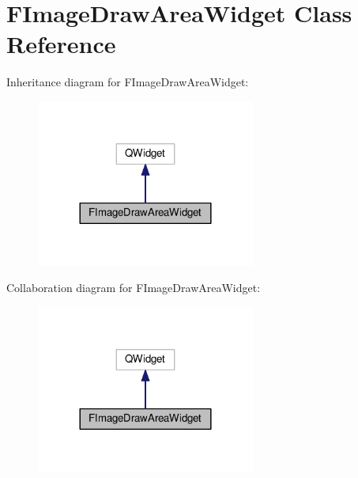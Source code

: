 \hypertarget{classFImageDrawAreaWidget}{}\section{F\+Image\+Draw\+Area\+Widget Class Reference}
\label{classFImageDrawAreaWidget}


Inheritance diagram for F\+Image\+Draw\+Area\+Widget\+:
\nopagebreak
\begin{figure}[H]
\begin{center}
\leavevmode
\includegraphics[width=204pt]{classFImageDrawAreaWidget__inherit__graph}
\end{center}
\end{figure}


Collaboration diagram for F\+Image\+Draw\+Area\+Widget\+:
\nopagebreak
\begin{figure}[H]
\begin{center}
\leavevmode
\includegraphics[width=204pt]{classFImageDrawAreaWidget__coll__graph}
\end{center}
\end{figure}
